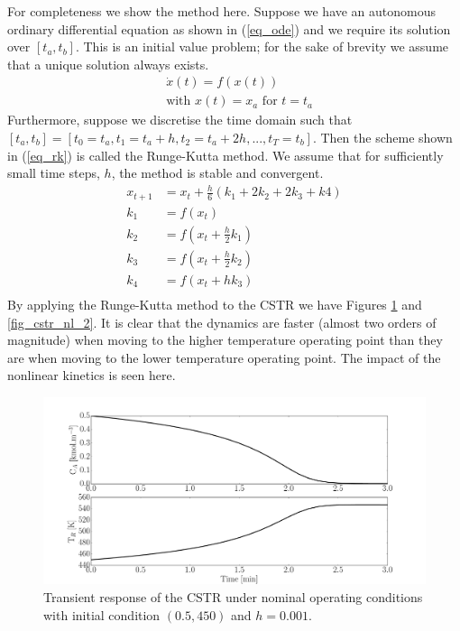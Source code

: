 \documentclass[../masters.tex]{subfiles}
\begin{document}
For completeness we show the method here. Suppose we have an autonomous ordinary differential equation as shown in (\ref{eq_ode}) and we require its solution over $[t_a, t_b]$. This is an initial value problem; for the sake of brevity we assume that a unique solution always exists.
\begin{equation}
\begin{aligned}
&\dot{x}(t) = f(x(t)) \\
&\text{with } x(t) = x_a \text{ for } t=t_a
\end{aligned}
\label{eq_ode}
\end{equation}
Furthermore, suppose we discretise the time domain such that $[t_a, t_b] = [t_0=t_a, t_1= t_a+ h, t_2=t_a+ 2h,...,t_T = t_b]$. Then the scheme shown in (\ref{eq_rk}) is called the Runge-Kutta method. We assume that for sufficiently small time steps, $h$, the method is stable and convergent.
\begin{equation}
\begin{aligned}
x_{t+1} &= x_{t} + \frac{h}{6}\left(k_1 + 2k_2 + 2k_3 +k4\right) \\
k_1 &= f(x_t) \\
k_2 &= f(x_t + \frac{h}{2}k_1) \\
k_3 &= f(x_t+ \frac{h}{2}k_2) \\
k_4 &= f(x_t+ hk_3) \\
\end{aligned}
\label{eq_rk}
\end{equation}  
By applying the Runge-Kutta method to the CSTR we have Figures \ref{fig_cstr_nl_1} and \ref{fig_cstr_nl_2}. It is clear that the dynamics are faster (almost two orders of magnitude) when moving to the higher temperature operating point than they are when moving to the lower temperature operating point. The impact of the nonlinear kinetics is seen here. 
\begin{figure}[H] 
\centering
\includegraphics[scale=0.3]{cstr_nl_1.pdf}
\caption{Transient response of the CSTR under nominal operating conditions with initial condition $(0.5, 450)$ and $h=0.001$.}
\label{fig_cstr_nl_1}
\end{figure}
\end{document}
